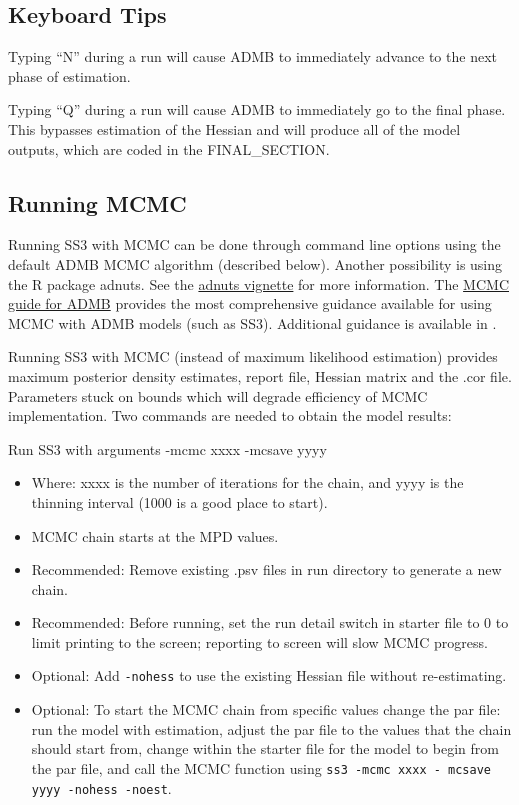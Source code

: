 \subsection{Keyboard Tips}
Typing ``N'' during a run will cause ADMB to immediately advance to the next phase of estimation.

Typing ``Q''  during a run will cause ADMB to immediately go to the final phase. This bypasses estimation of the Hessian and will produce all of the model outputs, which are coded in the FINAL\_SECTION.

\subsection{Running MCMC}
 Running SS3 with MCMC can be done through command line options using the default ADMB MCMC algorithm (described below). Another possibility is using the R package adnuts. See the \href{https://cran.r-project.org/web/packages/adnuts/vignettes/adnuts.html}{adnuts vignette} for more information. The \href{https://www.admb-project.org/developers/mcmc/mcmc-guide-for-admb.pdf}{MCMC guide for ADMB} provides the most comprehensive guidance available for using MCMC with ADMB models (such as SS3). Additional guidance is available in \citep{monnahan2019overcoming}.

 Running SS3 with MCMC (instead of maximum likelihood estimation) provides maximum posterior density estimates, report file, Hessian matrix and the .cor file. Parameters stuck on bounds which will degrade efficiency of MCMC implementation. Two commands are needed to obtain the model results:
 
\noindent Run SS3 with arguments -mcmc xxxx -mcsave yyyy
 \begin{itemize}
 	\item Where: xxxx is the number of iterations for the chain, and yyyy is the thinning interval (1000 is a good place to start).
 	\item MCMC chain starts at the MPD values.
 	\item Recommended: Remove existing .psv files in run directory to generate a new chain.
 	\item Recommended: Before running, set the run detail switch in starter file to 0 to limit printing to the screen; reporting to screen will slow MCMC progress.
 	\item Optional: Add \texttt{-nohess} to use the existing Hessian file without re-estimating.
 	\item Optional: To start the MCMC chain from specific values change the par file: run the model with estimation, adjust the par file to the values that the chain should start from, change within the starter file for the model to begin from the par file, and call the MCMC function using \texttt{ss3 -mcmc xxxx - mcsave yyyy -nohess -noest}.
 \end{itemize}
	
